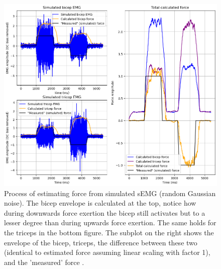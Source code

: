 \begin{figure}[h!t]
	\begin{center}
		\includegraphics[width=1.0\columnwidth]{images/force_simulation.png}
	\end{center}
	\caption{Process of estimating force from simulated sEMG (random Gaussian noise). The bicep envelope is calculated at the top, notice how during downwards force exertion the bicep still activates but to a lesser degree than during upwards force exertion. The same holds for the triceps in the bottom figure. The subplot on the right shows the envelope of the bicep, triceps, the difference between these two (identical to estimated force assuming linear scaling with factor 1), and the 'measured' force .}
	\label{fig:force_simulation}
\end{figure}

